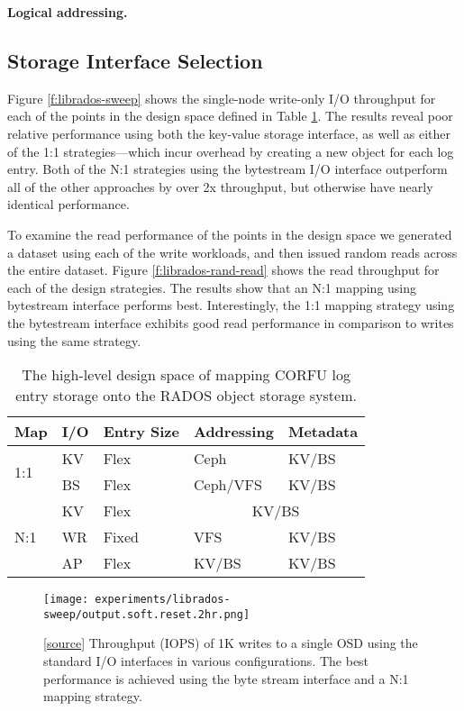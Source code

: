 \documentclass[10pt,twocolumn]{article}
\begin{document}
{\bf Logical addressing.}

\subsection{Storage Interface Selection}

Figure \ref{f:librados-sweep} shows the single-node write-only I/O throughput
for each of the points in the design space defined in Table \ref{t:init-ds}.
The results reveal poor relative performance using both the key-value storage
interface, as well as either of the 1:1 strategies---which incur overhead by
creating a new object for each log entry. Both of the N:1 strategies using the
bytestream I/O interface outperform all of the other approaches by over 2x
throughput, but otherwise have nearly identical performance.

To examine the read performance of the points in the design space we generated
a dataset using each of the write workloads, and then issued random reads
across the entire dataset. Figure \ref{f:librados-rand-read} shows the read
throughput for each of the design strategies. The results show that an N:1
mapping using bytestream interface performs best. Interestingly, the 1:1
mapping strategy using the bytestream interface exhibits good read performance
in comparison to writes using the same strategy.

\begin{table}
\begin{tabular}{ | l | l | l | l | l |}
\hline
Map & I/O & Entry Size & Addressing & Metadata \\ \hline
\multirow{2}{*}{1:1} & KV  & Flex     & Ceph      & KV/BS \\ \cline{2-5}
                     & BS  & Flex     & Ceph/VFS  & KV/BS \\ \hline
\multirow{4}{*}{N:1} & KV  & Flex     & \multicolumn{2}{|c|}{KV/BS} \\ \cline{2-5}
                     & WR  & Fixed    & VFS       & KV/BS \\ \cline{2-5}
                     & AP  & Flex     & KV/BS     & KV/BS \\
\hline
\end{tabular}
\caption{The high-level design space of mapping CORFU log entry storage onto
the RADOS object storage system.}
\label{t:init-ds}
\end{table}

\begin{figure}[h]
  \centering
  \texttt{[image: experiments/librados-sweep/output.soft.reset.2hr.png]}
  \caption{
[\href{https://github.com/noahdesu/zlog-popper/tree/master/experiments/librados-sweep/visualize.ipynb}{source}]
Throughput (IOPS) of 1K writes to a single OSD using the standard I/O
interfaces in various configurations. The best performance is achieved using
the byte stream interface and a N:1 mapping strategy.
}
\end{figure}
\end{document}
